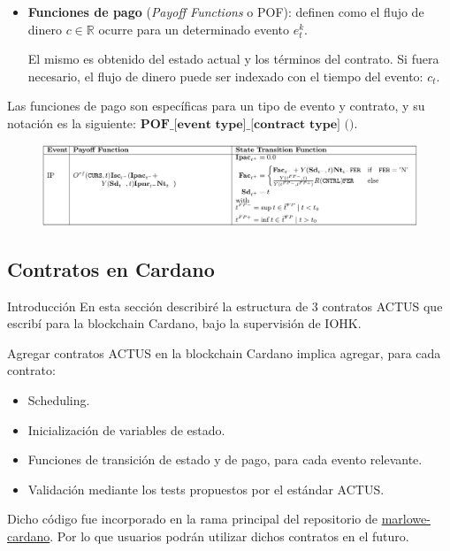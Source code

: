 \documentclass{beamer}
\newcommand{\nologo}{\setbeamertemplate{logo}{}} %
\begin{document}
{\nologo
\begin{frame}[fragile]
    \begin{itemize}
        \item \textbf{Funciones de pago} (\textit{Payoff Functions} o POF): definen como el flujo de dinero $c \in\mathbb{R}$ ocurre para un determinado evento $e^k_t$. 

            El mismo es obtenido del estado actual y los términos del contrato. Si fuera necesario, el flujo de dinero puede ser indexado con el tiempo del evento: $c_t$.
    \end{itemize}
    \pause
    \vfill

    Las funciones de pago son específicas para un tipo de evento y contrato, y su notación es la siguiente: $\textbf{POF\_[event type]\_[contract type] ()}$.
    \vfill
    \pause

    \begin{figure}[H]
        \centering
        \includegraphics[width=\textwidth]{POF_STF_IP_PAM.png}
    \end{figure}

\end{frame}
}

\subsection{Contratos en Cardano}

{\nologo
\begin{frame}{Introducción}
En esta sección describiré la estructura de 3 contratos ACTUS que escribí para la blockchain Cardano, bajo la supervisión de IOHK.\@

\vfill
\pause

Agregar contratos ACTUS en la blockchain Cardano implica agregar, para cada contrato:

\begin{itemize}
        \pause
    \item Scheduling.
        \pause
    \item Inicialización de variables de estado.
        \pause
    \item Funciones de transición de estado y de pago, para cada evento relevante.
        \pause
    \item Validación mediante los tests propuestos por el estándar ACTUS.
\end{itemize}

\pause
\vfill

Dicho código fue incorporado en la rama principal del repositorio de \href{https://github.com/input-output-hk/marlowe-cardano}{marlowe-cardano}. Por lo que usuarios podrán utilizar dichos contratos en el futuro.
\end{frame}
}
\end{document}
